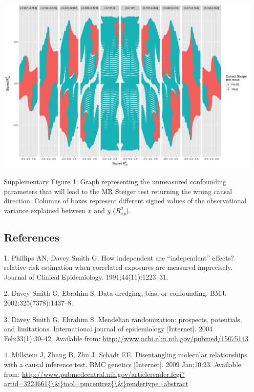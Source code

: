 \documentclass[]{article}
\begin{document}
\includegraphics{../images/unmeasured_conf_steiger.png}

Supplementary Figure 1: Graph representing the unmeasured confounding
parameters that will lead to the MR Steiger test returning the wrong
causal direction. Columns of boxes represent different signed values of
the observational variance explained between \(x\) and \(y\)
(\(R^2_{xy}\)).

\newpage

\subsection{References}\label{references}

\raggedright

\hypertarget{refs}{}
\hypertarget{ref-Phillips1991}{}
1. Phillips AN, Davey Smith G. How independent are ``independent''
effects? relative risk estimation when correlated exposures are measured
imprecisely. Journal of Clinical Epidemiology. 1991;44(11):1223--31.

\hypertarget{ref-DaveySmith2002}{}
2. Davey Smith G, Ebrahim S. Data dredging, bias, or confounding. BMJ.
2002;325(7378):1437--8.

\hypertarget{ref-DaveySmith2004}{}
3. Davey Smith G, Ebrahim S. Mendelian randomization: prospects,
potentials, and limitations. International journal of epidemiology
{[}Internet{]}. 2004 Feb;33(1):30--42. Available from:
\url{http://www.ncbi.nlm.nih.gov/pubmed/15075143}

\hypertarget{ref-Millstein2009}{}
4. Millstein J, Zhang B, Zhu J, Schadt EE. Disentangling molecular
relationships with a causal inference test. BMC genetics {[}Internet{]}.
2009 Jan;10:23. Available from:
\href{http://www.pubmedcentral.nih.gov/articlerender.fcgi?artid=3224661\%7B/\&\%7Dtool=pmcentrez\%7B/\&\%7Drendertype=abstract}{http://www.pubmedcentral.nih.gov/articlerender.fcgi?artid=3224661\{\textbackslash{}\&\}tool=pmcentrez\{\textbackslash{}\&\}rendertype=abstract}
\end{document}
